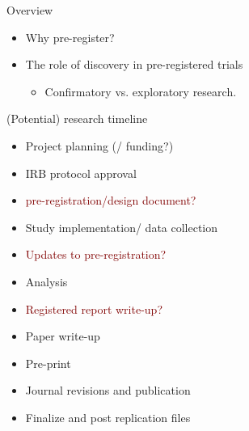 \documentclass[xcolor={dvipsnames},handout]{beamer}
\begin{document}
\begin{frame}{Overview}

\begin{itemize}
\item Why pre-register? 
\item The role of discovery in pre-registered trials
\begin{itemize}
\item Confirmatory vs. exploratory research. 
\end{itemize}
\end{itemize}

\end{frame}



\begin{frame}{(Potential) research timeline}

\begin{itemize}
\item Project planning (/ funding?)
\item IRB protocol approval
\item \textcolor{Maroon}{pre-registration/design document?}
\item Study implementation/ data collection 
\item \textcolor{Maroon}{Updates to pre-registration?}
\item Analysis
\item \textcolor{Maroon}{Registered report write-up?}
\item Paper write-up
\item Pre-print
\item Journal revisions and publication
\item Finalize and post replication files
\end{itemize}

\end{frame}


\end{document}
